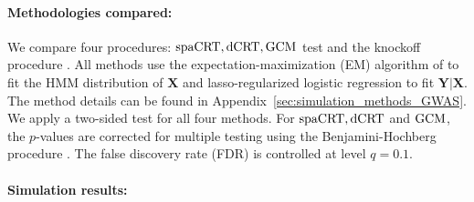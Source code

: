 \documentclass[12pt]{article}
\theoremstyle{definition}
\newcommand{\prx}{\bm X}								%
\newcommand{\pry}{{\bm Y}}								%
\newcommand{\dCRT}{\textnormal{dCRT}} 					%
\newcommand{\GCM}{\textnormal{GCM}}						%
\newcommand{\spacrt}{\textnormal{spaCRT}}               %
\begin{document}
  \paragraph{Methodologies compared:}
  
  We compare four procedures: $\spacrt,\dCRT,\GCM$ test and the knockoff procedure \citep{CetL16,sesia2019gene}. All methods use the expectation-maximization (EM) algorithm of \citet{scheet2006fast} to fit the HMM distribution of $\prx$ and lasso-regularized logistic regression to fit $\pry|\prx$. The method details can be found in Appendix~\ref{sec:simulation_methods_GWAS}. We apply a two-sided test for all four methods. For $\spacrt,\dCRT$ and $\GCM$, the $p$-values are corrected for multiple testing using the Benjamini-Hochberg procedure \citep{benjamini1995controlling}. The false discovery rate (FDR) is controlled at level $q = 0.1$.
  
  \paragraph{Simulation results:}
  
\end{document}
